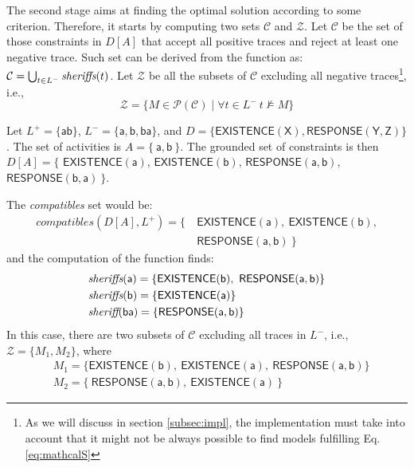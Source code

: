 The second stage aims at finding the optimal solution according to some criterion. Therefore, it starts by computing two sets $\mathcal{C}$ and $\mathcal{Z}$. 
%
Let $\mathcal{C}$ be the set of those constraints in $D[A]$ that accept all positive traces and reject at least one negative trace. Such set can be derived from the \textit{\sheriff} function as: $\mathcal{C} = \bigcup_{t\in L^-} \textit{sheriffs}(t)$.
Let $\mathcal{Z}$ be all the subsets of $\mathcal{C}$ excluding all negative traces\footnote{As we will discuss in section \ref{subsec:impl}, the implementation must take into account that it might not be always possible to find models fulfilling Eq.\ref{eq:mathcalS}}, i.e.,
\begin{equation}\label{eq:mathcalS}
\mathcal{Z}=\{M\in\mathcal{P}(\mathcal{C})\mid \forall t\in L^-~t\not\models M \} 
\end{equation}

\begin{example}
Let $L^+=\{\mathsf{ab}\}$, $L^-=\{\mathsf{a, b, ba}\}$, and $D=\{\mathsf{EXISTENCE(X)},\mathsf{RESPONSE(Y,Z)}\}$.
%
The set of activities is $A=\{\ \mathsf{a}, \mathsf{b}\ \}$.
The grounded set of constraints is then $D[A] = \{$ $\mathsf{EXISTENCE(a)}$, $\mathsf{EXISTENCE(b)}$, $\mathsf{RESPONSE(a,b)}$, $\mathsf{RESPONSE(b,a)}\ \}$.

The \textit{compatibles} set would be:
\begin{align*}
compatibles(D[A], L^+) =  \{\ & \mathsf{EXISTENCE(a)},\ \mathsf{EXISTENCE(b)},\\
&  \mathsf{RESPONSE(a,b)} \ \}	
\end{align*}
%
and the computation of the \textit{\sheriff} function finds:
\begin{subequations}
 \begin{align*}
     &\textit{sheriffs}(\mathsf{a}) =\{\mathsf{EXISTENCE(b)},\ \mathsf{RESPONSE(a,b)}\} \\
     &\textit{sheriffs}(\mathsf{b}) =\{\mathsf{EXISTENCE(a)}\} \\
     &\textit{sheriff}(\mathsf{ba})=\{\mathsf{RESPONSE(a,b)}\}
 \end{align*}
%
\end{subequations}
In this case, there are two subsets of $\mathcal{C}$ excluding all traces in $L^-$, i.e., $\mathcal{Z}=\{M_1,M_2\}$, where
\begin{subequations}
 \begin{align*}
     & M_1=\{\mathsf{EXISTENCE(b)},\ \mathsf{EXISTENCE(a)},\ \mathsf{RESPONSE(a,b)}\} \\
     & M_2=\{\ \mathsf{RESPONSE(a,b)},\ \mathsf{EXISTENCE(a)}\ \}
 \end{align*}
\end{subequations}
\end{example}


